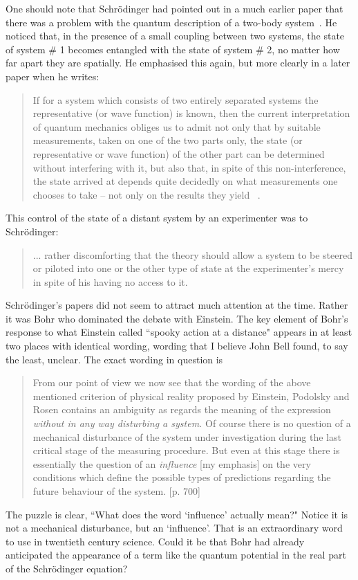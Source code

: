 \documentclass[12pt]{article}
\begin{document}
 One should note that Schr\"{o}dinger had pointed out in a much earlier paper that there was a problem with the quantum description of a two-body system~\cite{es27}.  
 He noticed that, in the presence of a small coupling between two systems, the state of system \# 1 becomes entangled with the state of system \# 2, no matter how far apart they are spatially.  He emphasised this again, but more clearly in a later paper  when he writes:
 \begin{quote}
 If for a system which consists of two entirely separated systems the representative (or wave function) is known, then the current interpretation of quantum mechanics obliges us to admit not only that by suitable measurements, taken on one of the two parts only, the state (or representative or wave function) of the other part can be determined without interfering with it, but also that, in spite of this non-interference, the state arrived at depends quite decidedly on what measurements one chooses to take -- not only on the results they yield~\cite{es36} .
 \end{quote}
 This control  of the state of a distant system by an experimenter was to Schr\"{o}dinger: 
 \begin{quote}
 ... rather discomforting that the theory should allow a system to be steered or piloted into one or the other type of state at the experimenter's mercy in spite of his having no access to it. 
 \end{quote}
 Schr\"{o}dinger's papers did not seem to attract much attention at the time.  Rather it was Bohr who dominated the debate with Einstein.  The key element of Bohr's response to what Einstein called ``spooky action at a distance" appears in at least two places with identical wording, wording that I believe John Bell found, to say the least, unclear.  The exact wording in question is
 \begin{quote}  
 From our point of view we now see that the wording of the above mentioned criterion of physical reality proposed by Einstein, Podolsky and Rosen contains an ambiguity as regards the meaning of the expression {\em without in any way disturbing a system.}  Of course there is no question of a mechanical disturbance of the system under investigation during the last critical stage of the measuring procedure.  But even at this stage there is essentially the question of an {\em influence} [my emphasis] on the very conditions which define the possible types of predictions regarding the future behaviour of the system.\cite{nb35} [p. 700]
 \end{quote}
 The puzzle is clear, ``What does the word `influence' actually mean?" Notice it is not a mechanical disturbance, but an `influence'.  That is an extraordinary word to use in twentieth century science.   
Could it be that Bohr had already anticipated the appearance of a term like the quantum potential in the real part of the Schr\"{o}dinger equation?  
\end{document}
